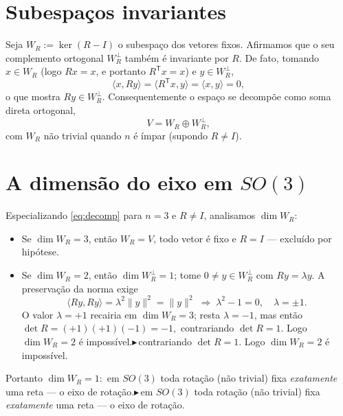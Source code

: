 \documentclass[12pt,a4paper]{article}   %
\newcommand{\nota}[1]{{\color{vermelho}%
  \ifmmode\blacktriangleright\,#1\else$\blacktriangleright$\,#1\fi}}
\newcommand{\ip}[2]{\langle #1,#2\rangle} %
\begin{document}
\section{Subespa\c{c}os invariantes}

Seja $W_R:=\ker(R-I)$ o subespa\c{c}o dos vetores fixos. Afirmamos que o
seu complemento ortogonal $W_R^{\perp}$ tamb\'em \'e invariante por $R$.
De fato, tomando $x\in W_R$ (logo $Rx=x$, e portanto $R^{\mathsf T}x=x$)
e $y\in W_R^{\perp}$,
\begin{equation}
\ip{x}{Ry}=\ip{R^{\mathsf T}x}{y}=\ip{x}{y}=0,
\end{equation}
o que mostra $Ry\in W_R^{\perp}$. Consequentemente o espa\c{c}o se
decomp\~oe como soma direta ortogonal,
\begin{equation}
V = W_R \oplus W_R^{\perp},
\label{eq:decomp}
\end{equation}
com $W_R$ n\~ao trivial quando $n$ \'e \'impar (supondo $R\neq I$).

\section{A dimens\~ao do eixo em $SO(3)$}

Especializando \eqref{eq:decomp} para $n=3$ e $R\neq I$, analisamos
$\dim W_R$:
\begin{itemize}\setlength{\itemsep}{2pt}
\item Se $\dim W_R = 3$, ent\~ao $W_R=V$, todo vetor \'e fixo e $R=I$
      --- exclu\'ido por hip\'otese.
\item Se $\dim W_R = 2$, ent\~ao $\dim W_R^{\perp}=1$; tome
      $0\neq y\in W_R^{\perp}$ com $Ry=\lambda y$. A preserva\c{c}\~ao
      da norma exige
      \begin{equation}
      \ip{Ry}{Ry}=\lambda^{2}\lVert y\rVert^{2}=\lVert y\rVert^{2}
      \;\Longrightarrow\; \lambda^{2}-1=0,\quad \lambda=\pm1.
      \end{equation}
      O valor $\lambda=+1$ recairia em $\dim W_R=3$; resta $\lambda=-1$,
      mas ent\~ao $\det R = (+1)(+1)(-1) = -1$, \nota{contrariando
      $\det R=1$. Logo $\dim W_R=2$ \'e imposs\'ivel.}
\end{itemize}
Portanto $\dim W_R = 1$: \nota{em $SO(3)$ toda rota\c{c}\~ao (n\~ao
trivial) fixa \emph{exatamente} uma reta --- o eixo de rota\c{c}\~ao.}
\end{document}
